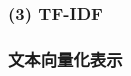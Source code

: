 \documentclass[cs4size,a4paper]{ctexart}
\numberwithin{equation}{section}
\numberwithin{table}{section}
\numberwithin{figure}{section}
\begin{document}


\subsubsection*{(3) TF-IDF}




\subsubsection{文本向量化表示}

\end{document}
